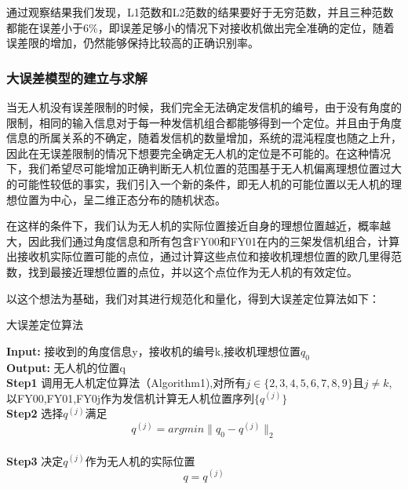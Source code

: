 \documentclass{my_paper}
\begin{document}
通过观察结果我们发现，L1范数和L2范数的结果要好于无穷范数，并且三种范数都能在误差小于6\%，即误差足够小的情况下对接收机做出完全准确的定位，随着误差限的增加，仍然能够保持比较高的正确识别率。


\subsubsection{大误差模型的建立与求解}
当无人机没有误差限制的时候，我们完全无法确定发信机的编号，由于没有角度的限制，相同的输入信息对于每一种发信机组合都能够得到一个定位。并且由于角度信息的所属关系的不确定，随着发信机的数量增加，系统的混沌程度也随之上升，因此在无误差限制的情况下想要完全确定无人机的定位是不可能的。在这种情况下，我们希望尽可能增加正确判断无人机位置的范围基于无人机偏离理想位置过大的可能性较低的事实，我们引入一个新的条件，即无人机的可能位置以无人机的理想位置为中心，呈二维正态分布的随机状态。

在这样的条件下，我们认为无人机的实际位置接近自身的理想位置越近，概率越大，因此我们通过角度信息和所有包含FY00和FY01在内的三架发信机组合，计算出接收机实际位置可能的点位，通过计算这些点位和接收机理想位置的欧几里得范数，找到最接近理想位置的点位，并以这个点位作为无人机的有效定位。

以这个想法为基础，我们对其进行规范化和量化，得到大误差定位算法如下：
\begin{algorithm}[H]
\caption{\small 大误差定位算法}
\textbf{Input:} 接收到的角度信息y，接收机的编号k,接收机理想位置$q_0$\\
\textbf{Output:} 无人机的位置q\\
\textbf{Step1} 调用无人机定位算法（Algorithm1),对所有$j\in\{2,3,4,5,6,7,8,9\}$且$j\neq k$,以FY00,FY01,FY0j作为发信机计算无人机位置序列$\{q^{(j)}\}$\\
\textbf{Step2} 选择$q^{(j)}$满足$$q ^ { ( j ) } = argmin \| q_0 - q ^ { ( j ) } \| _ { 2 }$$ \\
\textbf{Step3} 决定$q^{(j)}$作为无人机的实际位置$$q= q ^ { ( j ) }$$
\end{algorithm}
\end{document}
